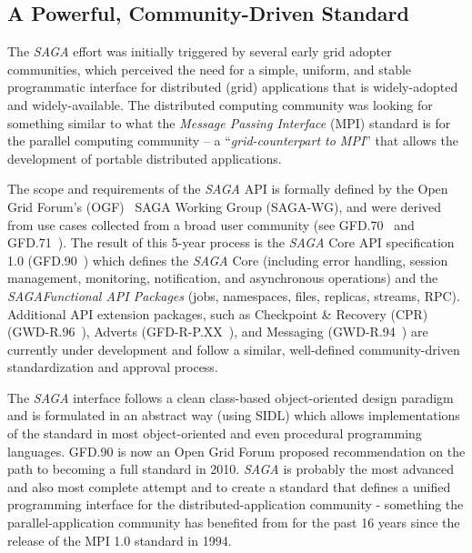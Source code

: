 \documentclass[a4paper,10pt]{article}
\newcommand{\sagaspec}{\textit{SAGA}\xspace}
\newcommand{\spec}{\sagaspec}
\begin{document}
\vspace{-0.8em}

\subsection*{A Powerful, Community-Driven Standard}
\vspace{-0.6em}

 The \spec effort was initially triggered by several early grid
 adopter communities, which perceived the need for a simple, uniform,
 and stable programmatic interface for distributed (grid) applications
 that is widely-adopted and widely-available. The distributed
 computing community was looking for something similar to what the
 \textit{Message Passing Interface} (MPI) standard is for the parallel
 computing community -- a ``\textit{grid-counterpart to MPI}'' that
 allows the development of portable distributed applications.
 
 
 The scope and requirements of the \spec API is formally defined by
 the Open Grid Forum's (OGF)~\cite{ogf} SAGA Working Group (SAGA-WG),
 and were derived from use cases collected from a broad user community
 (see GFD.70~\cite{ogf-gfd-70} and GFD.71~\cite{ogf-gfd-71}). The
 result of this 5-year process is the \spec Core API specification 1.0
 (GFD.90~\cite{ogf-gfd-90}) which defines the \spec Core (including
 error handling, session management, monitoring, notification, and
 asynchronous operations) and the \spec \textit{Functional API
 Packages} (jobs, namespaces, files, replicas, streams, RPC).
 Additional API extension packages, such as Checkpoint \& Recovery
 (CPR) (GWD-R.96~\cite{ogf-gwd-r-96}), Adverts
 (GFD-R-P.XX~\cite{ogf-gwd-r-p-xx}), and Messaging
 (GWD-R.94~\cite{ogf-gwd-r-94}) are currently under development and
 follow a similar, well-defined community-driven standardization and
 approval process. 

 
 The \spec interface follows a clean class-based object-oriented
 design paradigm and is formulated in an abstract way (using SIDL)
 which allows implementations of the standard in most object-oriented
 and even procedural programming languages. GFD.90 is now an Open Grid
 Forum proposed recommendation on the path to becoming a full standard
 in 2010. \spec is probably the most advanced and also most complete
 attempt and to create a standard that defines a unified programming
 interface for the distributed-application community - something the
 parallel-application community has benefited from for the past 16
 years since the release of the MPI 1.0 standard in 1994. 
 
\end{document}
